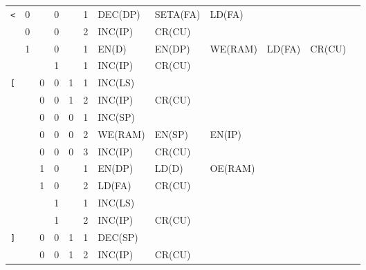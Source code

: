 \begin{longtable}[c] {c|cccc|c|llllll}
    \rowcolor{White} \texttt{<}   & 0 &   & 0     &      & 1     & DEC(DP)  & SETA(FA) & LD(FA)  &        &        &        \\
    \rowcolor{White}              & 0 &   & 0     &      & 2     & INC(IP)  & CR(CU)   &         &        &        &        \\
    \rowcolor{Gray}               & 1 &   & 0     &      & 1     & EN(D)    & EN(DP)   & WE(RAM) & LD(FA) & CR(CU) &        \\
    \rowcolor{White}              &   &   & 1     &      & 1     & INC(IP)  & CR(CU)   &         &        &        &        \\ \hline
    
    \rowcolor{Gray}  \texttt{[}   &   & 0 & 0     & 1    & 1     & INC(LS)  &          &         &        &        &        \\
    \rowcolor{Gray}               &   & 0 & 0     & 1    & 2     & INC(IP)  & CR(CU)   &         &        &        &        \\      
    \rowcolor{White}              &   & 0 & 0     & 0    & 1     & INC(SP)  &          &         &        &        &        \\
    \rowcolor{White}              &   & 0 & 0     & 0    & 2     & WE(RAM)  & EN(SP)   & EN(IP)  &        &        &        \\
    \rowcolor{White}              &   & 0 & 0     & 0    & 3     & INC(IP)  & CR(CU)   &         &        &        &        \\
    \rowcolor{Gray}               &   & 1 & 0     &      & 1     & EN(DP)   & LD(D)    & OE(RAM) &        &        &        \\
    \rowcolor{Gray}               &   & 1 & 0     &      & 2     & LD(FA)   & CR(CU)   &         &        &        &        \\
    \rowcolor{White}              &   &   & 1     &      & 1     & INC(LS)  &          &         &        &        &        \\
    \rowcolor{White}              &   &   & 1     &      & 2     & INC(IP)  & CR(CU)   &         &        &        &        \\ \hline
    
    \rowcolor{White} \texttt{]}   &   & 0 & 0     & 1    & 1     & DEC(SP)  &          &         &        &        &        \\
    \rowcolor{White}              &   & 0 & 0     & 1    & 2     & INC(IP)  & CR(CU)   &         &        &        &        \\
        

\end{longtable}
